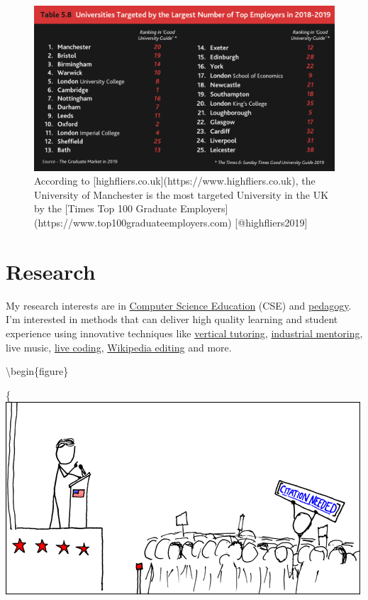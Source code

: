 \documentclass[12pt,]{book}
\begin{document}
\begin{figure}

{\centering \includegraphics[width=1\linewidth]{images/high-fliers-table} 

}

\caption{According to [highfliers.co.uk](https://www.highfliers.co.uk), the University of Manchester is the most targeted University in the UK by the [Times Top 100 Graduate Employers](https://www.top100graduateemployers.com) [@highfliers2019]}\label{fig:unnamed-chunk-5}
\end{figure}

\hypertarget{research}{%
\chapter{Research}\label{research}}

My research interests are in \href{https://scholar.google.com/citations?view_op=search_authors\&hl=en\&mauthors=label:computer_science_education}{Computer Science Education} (CSE) and \href{https://en.wikipedia.org/wiki/Pedagogy}{pedagogy}. \citep{JohnBiggs2011} I'm interested in methods that can deliver high quality learning and student experience using innovative techniques like \protect\hyperlink{vertical-tutoring-1}{vertical tutoring}, \href{https://www.cs.manchester.ac.uk/connect/business-engagement/industrial-mentoring/}{industrial mentoring}, live music, \href{https://en.wikipedia.org/wiki/Live_coding}{live coding}, \protect\hyperlink{wikipedia}{Wikipedia editing} and more.

\textbackslash{}begin\{figure\}

\{\centering \includegraphics[width=0.7\linewidth]{images/wikipedian_protester}
\end{document}
